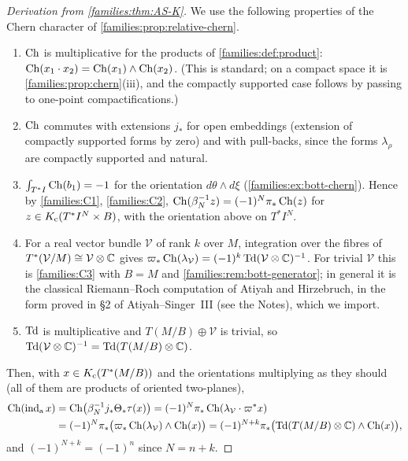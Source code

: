 \begin{proof}[Derivation from \cref{families:thm:AS-K}]
  We use the following properties of the Chern character of
  \cref{families:prop:relative-chern}.
  \begin{enumerate}[label=(C\arabic*)]
  \item\label{families:C1} $\operatorname{Ch}$ is multiplicative for the products of
    \cref{families:def:product}: $\operatorname{Ch}(x_1\cdot x_2)=\operatorname{Ch}(x_1)\wedge\operatorname{Ch}(x_2)$.
    (This is standard; on a compact space it is \cref{families:prop:chern}(iii),
    and the compactly supported case follows by passing to one-point
    compactifications.)
  \item\label{families:C2} $\operatorname{Ch}$ commutes with extensions $j_*$ for open
    embeddings (extension of compactly supported forms by zero) and with
    pull-backs, since the forms $\lambda_\rho$ are compactly supported and
    natural.
  \item\label{families:C3} $\int_{T^*I}\operatorname{Ch}(b_1)=-1$ for the orientation
    $d\theta\wedge d\xi$ (\cref{families:ex:bott-chern}). Hence by
    \ref{families:C1}, \ref{families:C2},
    $\operatorname{Ch}(\beta_N^{-1}z)=(-1)^N\pi_*\operatorname{Ch}(z)$ for $z\in K_{\mathrm{c}}(T^*I^N\times B)$, with
    the orientation above on $T^*I^N$.
  \item\label{families:C4} For a real vector bundle $\mathcal V$ of rank $k$
    over $M$, integration over the fibres of $T^*(\mathcal V/M)\cong\mathcal
    V\otimes\mathbb{C}$ gives
    $\varpi_*\operatorname{Ch}(\lambda_{\mathcal V})=(-1)^k\operatorname{Td}(\mathcal V\otimes\mathbb{C})^{-1}$.
    For trivial $\mathcal V$ this is \ref{families:C3} with $B=M$ and
    \cref{families:rem:bott-generator}; in general it is the classical
    Riemann--Roch computation of Atiyah and Hirzebruch, in the form proved in
    \S2 of Atiyah--Singer~III (see the Notes), which we import.
  \item\label{families:C5} $\operatorname{Td}$ is multiplicative and
    $T(M/B)\oplus\mathcal V$ is trivial, so $\operatorname{Td}(\mathcal V\otimes\mathbb{C})^{-1}=
    \operatorname{Td}(T(M/B)\otimes\mathbb{C})$.
  \end{enumerate}
  Then, with $x\in K_{\mathrm{c}}(T^*(M/B))$ and the orientations multiplying as they
  should (all of them are products of oriented two-planes),
  \begin{align*}
    \operatorname{Ch}(\operatorname{ind}_{\mathrm{a}} x)&=\operatorname{Ch}\bigl(\beta_N^{-1}j_*\Theta_*\tau(x)\bigr)
    =(-1)^N\pi_*\operatorname{Ch}(\lambda_{\mathcal V}\cdot\varpi^*x)\\
    &=(-1)^N\pi_*\bigl(\varpi_*\operatorname{Ch}(\lambda_{\mathcal V})\wedge\operatorname{Ch}(x)\bigr)
    =(-1)^{N+k}\pi_*\bigl(\operatorname{Td}(T(M/B)\otimes\mathbb{C})\wedge\operatorname{Ch}(x)\bigr),
  \end{align*}
  and $(-1)^{N+k}=(-1)^n$ since $N=n+k$.
\end{proof}

